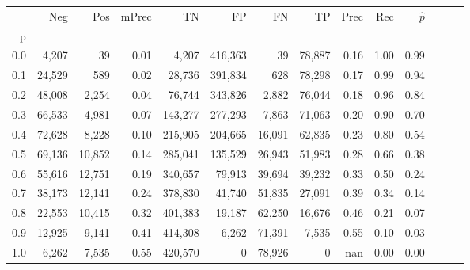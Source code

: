 \begin{tabular}{rrrrrrrrrrrrrr}
\toprule
{} &     Neg &     Pos & mPrec &       TN &       FP &      FN &      TP &  Prec &   Rec & $\hat{p}$ \\
p   &         &         &       &          &          &         &         &       &       &           \\
\midrule
0.0 &   4,207 &      39 &  0.01 &    4,207 &  416,363 &      39 &  78,887 &  0.16 &  1.00 &      0.99 \\
0.1 &  24,529 &     589 &  0.02 &   28,736 &  391,834 &     628 &  78,298 &  0.17 &  0.99 &      0.94 \\
0.2 &  48,008 &   2,254 &  0.04 &   76,744 &  343,826 &   2,882 &  76,044 &  0.18 &  0.96 &      0.84 \\
0.3 &  66,533 &   4,981 &  0.07 &  143,277 &  277,293 &   7,863 &  71,063 &  0.20 &  0.90 &      0.70 \\
0.4 &  72,628 &   8,228 &  0.10 &  215,905 &  204,665 &  16,091 &  62,835 &  0.23 &  0.80 &      0.54 \\
0.5 &  69,136 &  10,852 &  0.14 &  285,041 &  135,529 &  26,943 &  51,983 &  0.28 &  0.66 &      0.38 \\
0.6 &  55,616 &  12,751 &  0.19 &  340,657 &   79,913 &  39,694 &  39,232 &  0.33 &  0.50 &      0.24 \\
0.7 &  38,173 &  12,141 &  0.24 &  378,830 &   41,740 &  51,835 &  27,091 &  0.39 &  0.34 &      0.14 \\
0.8 &  22,553 &  10,415 &  0.32 &  401,383 &   19,187 &  62,250 &  16,676 &  0.46 &  0.21 &      0.07 \\
0.9 &  12,925 &   9,141 &  0.41 &  414,308 &    6,262 &  71,391 &   7,535 &  0.55 &  0.10 &      0.03 \\
1.0 &   6,262 &   7,535 &  0.55 &  420,570 &        0 &  78,926 &       0 &   nan &  0.00 &      0.00 \\
\bottomrule
\end{tabular}
